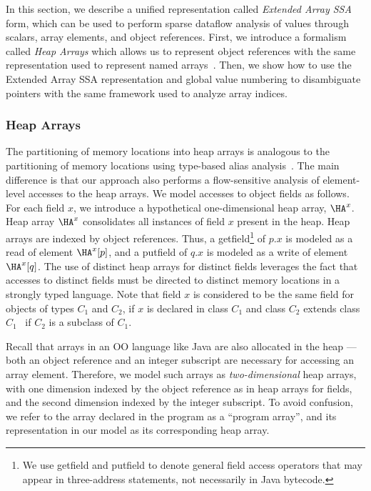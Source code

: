 In this section, we describe a unified representation called
{\em Extended Array SSA} form, which can be used to perform
sparse dataflow analysis of values through scalars, array
elements, and object references.  First, we introduce a
formalism called {\em Heap Arrays} which allows us to represent
object references with the same representation used to
represent named arrays~\cite{KnSa98}.   Then, we show how to use the
Extended Array SSA representation and global value numbering to
disambiguate pointers with the same framework used to analyze
array indices.

\subsubsection{Heap Arrays}\label{heaparray}
The partitioning of memory locations into
heap arrays is analogous to the partitioning of memory locations using
type-based alias analysis~\cite{DiwanMM1998}.  The main difference is that
our approach also performs a flow-sensitive analysis of
element-level accesses to the heap arrays.
We model accesses to object fields as follows.
For each field $x$, we introduce
a hypothetical one-dimensional
heap array,  $\HA^x$.
Heap array $\HA^x$ consolidates all instances of field
$x$ present in the heap.
Heap arrays are indexed by object references.
Thus, a {\sc getfield}\footnote{We use {\sc getfield} and {\sc putfield}
to denote general
field access operators that may appear in three-address
statements, not necessarily in Java bytecode.}
of $p.x$ is modeled as a read of element $\HA^x[p]$,
and a {\sc putfield} of $q.x$ is modeled as a write of element $\HA^x[q]$.
The use of distinct heap arrays for distinct fields leverages the 
fact that accesses to distinct fields must be directed to 
distinct memory locations in a strongly typed language.
Note that field $x$ is considered to be the same field for objects of types
$C_1$ and $C_2$, if $x$ is
declared in class $C_1$ and class $C_2$ extends class $C_1$ \ie\ if $C_2$ is
a subclass of $C_1$.

Recall that 
arrays in an OO language like Java
are also allocated in the heap --- both an object reference and an
integer subscript are necessary for accessing an array element. 
Therefore, we model such arrays as {\it two-dimensional} heap
arrays, with one dimension indexed by
the object reference as in heap arrays for fields, and the second
dimension indexed by the integer subscript.  
To avoid confusion, we refer to the array declared in the program 
as a ``program array'', and its representation in our model as 
its corresponding heap array.

